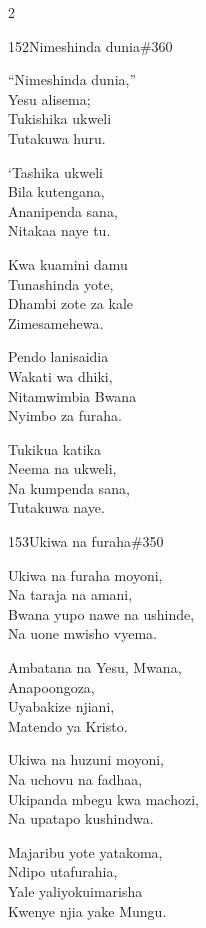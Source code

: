 \documentclass{article}
\begin{document}
\begin{multicols}{2}
\begin{hymn}{152}{Nimeshinda dunia}{\#360}
\begin{stanza}
``Nimeshinda dunia,''\\
Yesu alisema;\\
Tukishika ukweli\\
Tutakuwa huru.
\end{stanza}
\begin{chorus}
`Tashika ukweli\\
Bila kutengana,\\
Ananipenda sana,\\
Nitakaa naye tu.
\end{chorus}
\begin{stanza}
Kwa kuamini damu\\
Tunashinda yote,\\
Dhambi zote za kale\\
Zimesamehewa.
\end{stanza}
\begin{stanza}
Pendo lanisaidia\\
Wakati wa dhiki,\\
Nitamwimbia Bwana\\
Nyimbo za furaha.
\end{stanza}
\begin{stanza}
Tukikua katika\\
Neema na ukweli,\\
Na kumpenda sana,\\
Tutakuwa naye.
\end{stanza}
\end{hymn}

\begin{hymn}{153}{Ukiwa na furaha}{\#350}
\begin{stanza}
Ukiwa na furaha moyoni,\\
Na taraja na amani,\\
Bwana yupo nawe na ushinde,\\
Na uone mwisho vyema.
\end{stanza}
\begin{chorus}
Ambatana na Yesu, Mwana,\\
Anapoongoza,\\
Uyabakize njiani,\\
Matendo ya Kristo.
\end{chorus}
\begin{stanza}
Ukiwa na huzuni moyoni,\\
Na uchovu na fadhaa,\\
Ukipanda mbegu kwa machozi,\\
Na upatapo kushindwa.
\end{stanza}
\begin{stanza}
Majaribu yote yatakoma,\\
Ndipo utafurahia,\\
Yale yaliyokuimarisha\\
Kwenye njia yake Mungu.
\end{stanza}
\end{hymn}


\end{multicols}
\end{document}
